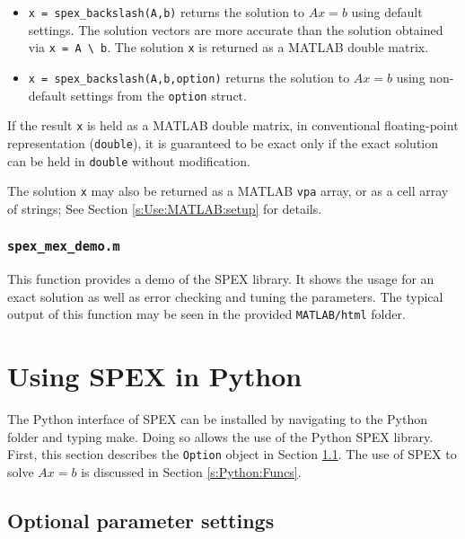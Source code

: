 \documentclass[12pt]{report}
\theoremstyle{definition}
\begin{document}
\begin{itemize}

\item \verb|x = spex_backslash(A,b)| returns the solution to $A x =
b$ using default settings. The solution vectors are more accurate than
the solution obtained via \verb|x = A \ b|.  The solution \verb|x| is
returned as a MATLAB double matrix.

\item \verb|x = spex_backslash(A,b,option)| returns the solution to $A x =
b$ using non-default settings from the \verb|option| struct.

\end{itemize}

If the result \verb|x| is held as a MATLAB double matrix, in conventional
floating-point representation (\verb|double|), it is guaranteed to be exact
only if the exact solution can be held in \verb|double| without modification.

The solution \verb|x| may also be returned as a MATLAB \verb|vpa| array, or as
a cell array of strings; See Section \ref{s:Use:MATLAB:setup} for details.


\subsection{\texttt{spex\_mex\_demo.m}}

This function provides a demo of the SPEX library. It shows the usage for an exact
solution as well as error checking and tuning the parameters. The typical output
of this function may be seen in the provided \verb|MATLAB/html| folder.

\chapter{Using SPEX in Python}


The Python interface of SPEX can be installed by navigating to the Python folder and typing make. Doing so allows the use of the Python SPEX library. First, this section describes the \verb|Option| object in Section \ref{s:Python:option}. The use of SPEX to solve $Ax=b$ is discussed in Section \ref{s:Python:Funcs}.

\section{Optional parameter settings}\label{s:Python:option}
\end{document}
